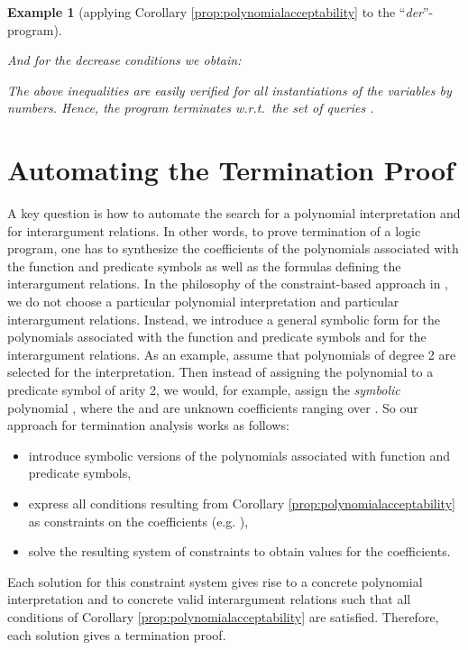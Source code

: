 \documentclass[envcountsame]{tlp}
\newcounter{ex:der-lastsymconsctr}
\newtheorem{example}{Example}
\begin{document}
\begin{example}[applying Corollary \ref{prop:polynomialacceptability} to the
``\textit{der}''-program]
\vspace*{-.4cm}

{\small
}

\vspace*{-.2cm}



\noindent
And for the decrease conditions we obtain:


\vspace*{-.3cm}



{\scriptsize
}


\vspace*{-.2cm}


The above inequalities are easily
verified for all instantiations of the variables by numbers. 
Hence, the program terminates w.r.t.\ the set of queries . {\hfill{}}
\end{example}







\section{Automating the Termination Proof}
\label{sec:automation}

A key question is how to automate the search for a polynomial interpretation
and for interargument relations. In other words, to prove
termination of a logic program, one has to synthesize the coefficients of the polynomials
associated with the function and predicate symbols as well as the formulas
 defining the 
interargument relations.
In the philosophy of the constraint-based approach in
\cite{Decorteetal98}, we do not choose a particular polynomial interpretation
and particular interargument relations. Instead, we introduce a general symbolic form
for the polynomials associated with the function and predicate symbols and for
the interargument relations. As 
an example,  assume that polynomials of degree 2 are selected for the
interpretation. Then instead of assigning the polynomial  to a predicate symbol  of arity 2, we would, for example, assign
the \emph{symbolic} polynomial ,
where the  and  
are unknown coefficients ranging
over . So our approach for termination analysis works as follows:
\begin{itemize}
\item   introduce symbolic versions of the 
polynomials associated with function and predicate symbols, 
\item   express all conditions resulting from Corollary
\ref{prop:polynomialacceptability} as constraints on the coefficients
(e.g. ), 
\item   solve the resulting system of constraints to obtain values for the coefficients.
\end{itemize}
Each solution for this constraint system gives rise to a concrete polynomial
interpretation and to concrete valid interargument
relations such that all conditions of 
Corollary
\ref{prop:polynomialacceptability} are satisfied. 
Therefore, each solution gives a termination proof. 
\end{document}

